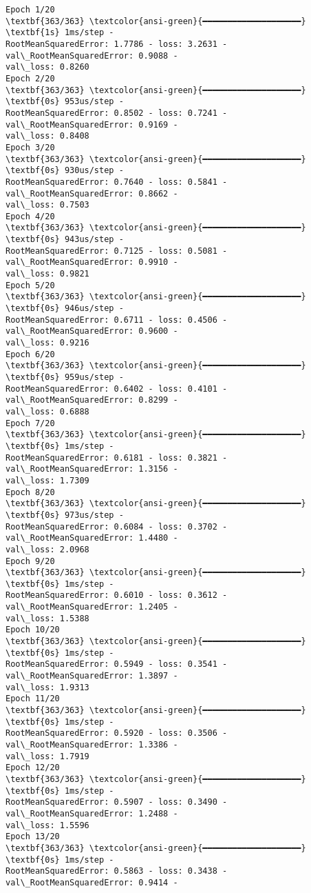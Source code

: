 \documentclass[12pt letter]{report}
\begin{document}
    \begin{Verbatim}[commandchars=\\\{\}]
Epoch 1/20
\textbf{363/363} \textcolor{ansi-green}{━━━━━━━━━━━━━━━━━━━━} \textbf{1s} 1ms/step -
RootMeanSquaredError: 1.7786 - loss: 3.2631 - val\_RootMeanSquaredError: 0.9088 -
val\_loss: 0.8260
Epoch 2/20
\textbf{363/363} \textcolor{ansi-green}{━━━━━━━━━━━━━━━━━━━━} \textbf{0s} 953us/step -
RootMeanSquaredError: 0.8502 - loss: 0.7241 - val\_RootMeanSquaredError: 0.9169 -
val\_loss: 0.8408
Epoch 3/20
\textbf{363/363} \textcolor{ansi-green}{━━━━━━━━━━━━━━━━━━━━} \textbf{0s} 930us/step -
RootMeanSquaredError: 0.7640 - loss: 0.5841 - val\_RootMeanSquaredError: 0.8662 -
val\_loss: 0.7503
Epoch 4/20
\textbf{363/363} \textcolor{ansi-green}{━━━━━━━━━━━━━━━━━━━━} \textbf{0s} 943us/step -
RootMeanSquaredError: 0.7125 - loss: 0.5081 - val\_RootMeanSquaredError: 0.9910 -
val\_loss: 0.9821
Epoch 5/20
\textbf{363/363} \textcolor{ansi-green}{━━━━━━━━━━━━━━━━━━━━} \textbf{0s} 946us/step -
RootMeanSquaredError: 0.6711 - loss: 0.4506 - val\_RootMeanSquaredError: 0.9600 -
val\_loss: 0.9216
Epoch 6/20
\textbf{363/363} \textcolor{ansi-green}{━━━━━━━━━━━━━━━━━━━━} \textbf{0s} 959us/step -
RootMeanSquaredError: 0.6402 - loss: 0.4101 - val\_RootMeanSquaredError: 0.8299 -
val\_loss: 0.6888
Epoch 7/20
\textbf{363/363} \textcolor{ansi-green}{━━━━━━━━━━━━━━━━━━━━} \textbf{0s} 1ms/step -
RootMeanSquaredError: 0.6181 - loss: 0.3821 - val\_RootMeanSquaredError: 1.3156 -
val\_loss: 1.7309
Epoch 8/20
\textbf{363/363} \textcolor{ansi-green}{━━━━━━━━━━━━━━━━━━━━} \textbf{0s} 973us/step -
RootMeanSquaredError: 0.6084 - loss: 0.3702 - val\_RootMeanSquaredError: 1.4480 -
val\_loss: 2.0968
Epoch 9/20
\textbf{363/363} \textcolor{ansi-green}{━━━━━━━━━━━━━━━━━━━━} \textbf{0s} 1ms/step -
RootMeanSquaredError: 0.6010 - loss: 0.3612 - val\_RootMeanSquaredError: 1.2405 -
val\_loss: 1.5388
Epoch 10/20
\textbf{363/363} \textcolor{ansi-green}{━━━━━━━━━━━━━━━━━━━━} \textbf{0s} 1ms/step -
RootMeanSquaredError: 0.5949 - loss: 0.3541 - val\_RootMeanSquaredError: 1.3897 -
val\_loss: 1.9313
Epoch 11/20
\textbf{363/363} \textcolor{ansi-green}{━━━━━━━━━━━━━━━━━━━━} \textbf{0s} 1ms/step -
RootMeanSquaredError: 0.5920 - loss: 0.3506 - val\_RootMeanSquaredError: 1.3386 -
val\_loss: 1.7919
Epoch 12/20
\textbf{363/363} \textcolor{ansi-green}{━━━━━━━━━━━━━━━━━━━━} \textbf{0s} 1ms/step -
RootMeanSquaredError: 0.5907 - loss: 0.3490 - val\_RootMeanSquaredError: 1.2488 -
val\_loss: 1.5596
Epoch 13/20
\textbf{363/363} \textcolor{ansi-green}{━━━━━━━━━━━━━━━━━━━━} \textbf{0s} 1ms/step -
RootMeanSquaredError: 0.5863 - loss: 0.3438 - val\_RootMeanSquaredError: 0.9414 -

\end{Verbatim}
\end{document}
